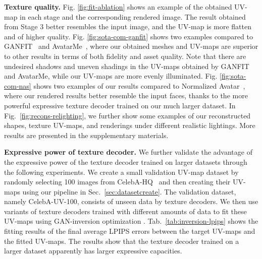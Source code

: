 \documentclass[10pt,twocolumn,letterpaper]{article}
\begin{document}
\noindent\textbf{Texture quality.}
Fig. \ref{fig:fit-ablation} shows an example of the obtained UV-map in each stage and the corresponding rendered image. 
The result obtained from Stage 3 better resembles the input image, and the UV-map is more flatten and of higher quality. 
Fig. \ref{fig:sota-com-ganfit} shows two examples compared to GANFIT~\cite{gecer2019ganfit} and AvatarMe~\cite{lattas2020avatarme}, where our obtained meshes and UV-maps are superior to other results in terms of both fidelity and asset quality. 
Note that there are undesired shadows and uneven shadings in the UV-maps obtained by GANFIT and AvatarMe, while our UV-maps are more evenly illuminated.
Fig. \ref{fig:sota-com-nas} shows two examples of our results compared to Normalized Avatar~\cite{luo2021normalized}, where our rendered results better resemble the input faces, thanks to the more powerful expressive texture decoder trained on our much larger dataset. 
In Fig.~\ref{fig:recons-relighting}, we further show some examples of our reconstructed shapes, texture UV-maps, and renderings under different realistic lightings.
More results are presented in the supplementary materials.


\begin{table}[!t]
\caption{Fitting errors on CelebA-UV-100 with different texture decoders trained on different amounts of data from FFHQ-UV. The linear basis is the PCA-based texture basis in Stage 1 of Sec.~\ref{sec:param-fit}.}
\label{tab:inversion-lpips}
\small
\centering
{}
\end{table} 

\noindent\textbf{Expressive power of texture decoder.}
We further validate the advantage of the expressive power of the texture decoder trained on larger datasets through the following experiments. 
We create a small validation UV-map dataset by randomly selecting 100 images from CelebA-HQ~\cite{karras2017progressive} and then creating their UV-maps using our pipeline in Sec.~\ref{sec:datasetcreate}. 
The validation dataset, namely CelebA-UV-100, consists of unseen data by texture decoders. 
We then use variants of texture decoders trained with different amounts of data to fit these UV-maps using GAN-inversion optimization \cite{karras2020analyzing}. 
Tab.~\ref{tab:inversion-lpips} shows the fitting results of the final average LPIPS errors between the target UV-maps and the fitted UV-maps.
The results show that the texture decoder trained on a larger dataset apparently has larger expressive capacities. 
\end{document}
